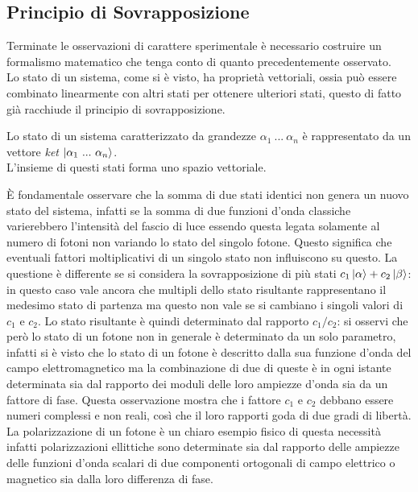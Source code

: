 \subsection{Principio di Sovrapposizione}
Terminate le osservazioni di carattere sperimentale è necessario costruire un formalismo matematico che tenga conto di quanto precedentemente osservato.\\
Lo stato di un sistema, come si è visto, ha proprietà vettoriali, ossia può essere combinato linearmente con altri stati per ottenere ulteriori stati, questo di fatto già racchiude il principio di sovrapposizione.
\begin{definition}
    Lo stato di un sistema caratterizzato da grandezze $\alpha_1\ ...\ \alpha_n$ è rappresentato da un vettore \emph{ket} $\ket{\alpha_1\ ...\ \alpha_n}$.\\L'insieme di questi stati forma uno spazio vettoriale.
\end{definition}
È fondamentale osservare che la somma di due stati identici non genera un nuovo stato del sistema, infatti se la somma di due funzioni d'onda classiche varierebbero l'intensità del fascio di luce essendo questa legata solamente al numero di fotoni non variando lo stato del singolo fotone. Questo significa che eventuali fattori moltiplicativi di un singolo stato non influiscono su questo. La questione è differente se si considera la sovrapposizione di più stati $c_1\ket{\alpha}+c_2\ket{\beta}$: in questo caso vale ancora che multipli dello stato risultante rappresentano il medesimo stato di partenza ma questo non vale se si cambiano i singoli valori di $c_1$ e $c_2$. Lo stato risultante è quindi determinato dal rapporto $c_1/c_2$: si osservi che però lo stato di un fotone non in generale è determinato da un solo parametro, infatti si è visto che lo stato di un fotone è descritto dalla sua funzione d'onda del campo elettromagnetico ma la combinazione di due di queste è in ogni istante determinata sia dal rapporto dei moduli delle loro ampiezze d'onda sia da un fattore di fase. Questa osservazione mostra che i fattore $c_1$ e $c_2$ debbano essere numeri complessi e non reali, così che il loro rapporti goda di due gradi di libertà. La polarizzazione di un fotone è un chiaro esempio fisico di questa necessità infatti polarizzazioni ellittiche sono determinate sia dal rapporto delle ampiezze delle funzioni d'onda scalari di due componenti ortogonali di campo elettrico o magnetico sia dalla loro differenza di fase.\\

